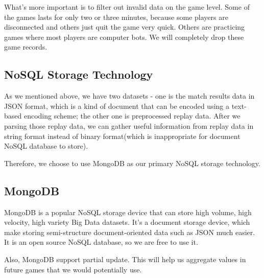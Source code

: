 \documentclass{article}
\begin{document}
What's more important is to filter out invalid data on the game level. Some of the games lasts for only two or three minutes, because some players are disconnected and others just quit the game very quick. Others are practicing games where most players are computer bots. We will completely drop these game records.








\subsection{NoSQL Storage Technology}

As we mentioned above, we have two datasets - one is the match results data in JSON format, which is a kind of document that can be encoded using a text-based encoding scheme; the other one is preprocessed replay data. After we parsing those replay data, we can gather useful information from replay data in string format instead of binary format(which is inappropriate for document NoSQL database to store).

Therefore, we choose to use MongoDB as our primary NoSQL storage technology.

\subsection{MongoDB}
    
MongoDB is a popular NoSQL storage device that can store high volume, high velocity, high variety Big Data datasets. It's a document storage device, which make storing semi-structure document-oriented data such as JSON much easier. It is an open source NoSQL database, so we are free to use it.

Also, MongoDB support partial update. This will help us aggregate values in future games that we would potentially use.
    
\end{document}
